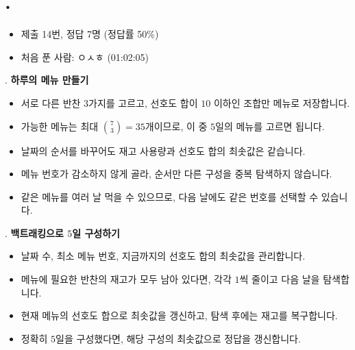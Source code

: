 
\section{\texorpdfstring{\pletter. \ptitle}{문제 \pletter}}

\begin{frame}[label=problem-K]
    \sectiontitle{\pletter}{\ptitle}
    \begin{itemize}
        \item 제출 14번, 정답 7명 (정답률 50\%)
        \item 처음 푼 사람: ㅇㅅㅎ (01:02:05)
    \end{itemize}
\end{frame}

\begin{frame}{\textbf{\pletter}. \ptitle}
    \textbf{하루의 메뉴 만들기}
    \begin{itemize}
        \item 서로 다른 반찬 $3$가지를 고르고, 선호도 합이 $10$ 이하인 조합만 메뉴로 저장합니다.
        \item 가능한 메뉴는 최대 $\binom{7}{3}=35$개이므로, 이 중 $5$일의 메뉴를 고르면 됩니다.
        \item 날짜의 순서를 바꾸어도 재고 사용량과 선호도 합의 최솟값은 같습니다.
        \item 메뉴 번호가 감소하지 않게 골라, 순서만 다른 구성을 중복 탐색하지 않습니다.
        \item 같은 메뉴를 여러 날 먹을 수 있으므로, 다음 날에도 같은 번호를 선택할 수 있습니다.
    \end{itemize}
\end{frame}

\begin{frame}{\textbf{\pletter}. \ptitle}
    \textbf{백트래킹으로 $5$일 구성하기}
    \begin{itemize}
        \item 날짜 수, 최소 메뉴 번호, 지금까지의 선호도 합의 최솟값을 관리합니다.
        \item 메뉴에 필요한 반찬의 재고가 모두 남아 있다면, 각각 $1$씩 줄이고 다음 날을 탐색합니다.
        \item 현재 메뉴의 선호도 합으로 최솟값을 갱신하고, 탐색 후에는 재고를 복구합니다.
        \item 정확히 $5$일을 구성했다면, 해당 구성의 최솟값으로 정답을 갱신합니다.
    \end{itemize}
\end{frame}

